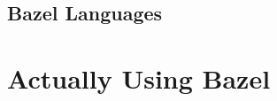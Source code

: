 \documentclass[aspectratio=169]{beamer}
\begin{document}
\subsection{Bazel Languages}
{
\begin{frame}
    
\end{frame}
}


\section{Actually Using Bazel}
\end{document}
